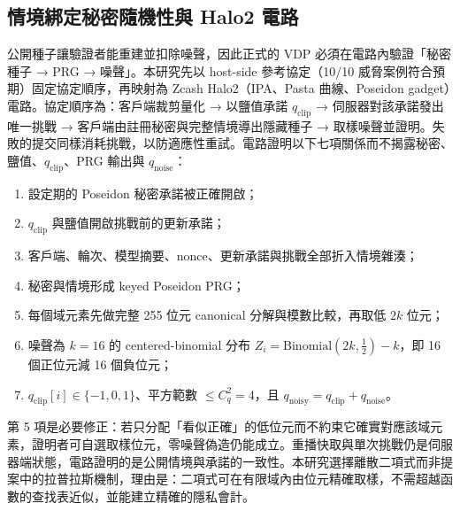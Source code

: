 \documentclass[12pt,a4paper]{article}
\newcommand{\qclip}{q_{\mathrm{clip}}}
\newcommand{\qnoise}{q_{\mathrm{noise}}}
\newcommand{\qnoisy}{q_{\mathrm{noisy}}}
\begin{document}
\subsection{情境綁定秘密隨機性與 Halo2 電路}
\label{sec:halo2}
公開種子讓驗證者能重建並扣除噪聲，因此正式的 VDP 必須在電路內驗證「秘密種子 → PRG → 噪聲」。本研究先以 host-side 參考協定（10/10 威脅案例符合預期）固定協定順序，再映射為 Zcash Halo2（IPA、Pasta 曲線、Poseidon gadget）電路。協定順序為：客戶端裁剪量化 → 以鹽值承諾 $\qclip$ → 伺服器對該承諾發出唯一挑戰 → 客戶端由註冊秘密與完整情境導出隱藏種子 → 取樣噪聲並證明。失敗的提交同樣消耗挑戰，以防適應性重試。電路證明以下七項關係而不揭露秘密、鹽值、$\qclip$、PRG 輸出與 $\qnoise$：
\begin{enumerate}
  \item 設定期的 Poseidon 秘密承諾被正確開啟；
  \item $\qclip$ 與鹽值開啟挑戰前的更新承諾；
  \item 客戶端、輪次、模型摘要、nonce、更新承諾與挑戰全部折入情境雜湊；
  \item 秘密與情境形成 keyed Poseidon PRG；
  \item 每個域元素先做完整 255 位元 canonical 分解與模數比較，再取低 $2k$ 位元；
  \item 噪聲為 $k=16$ 的 centered-binomial 分布 $Z_i=\mathrm{Binomial}(2k,\tfrac12)-k$，即 16 個正位元減 16 個負位元；
  \item $\qclip[i]\in\{-1,0,1\}$、平方範數 $\le C_q^2=4$，且 $\qnoisy=\qclip+\qnoise$。
\end{enumerate}
第 5 項是必要修正：若只分配「看似正確」的低位元而不約束它確實對應該域元素，證明者可自選取樣位元，零噪聲偽造仍能成立。重播快取與單次挑戰仍是伺服器端狀態，電路證明的是公開情境與承諾的一致性。本研究選擇離散二項式而非提案中的拉普拉斯機制，理由是：二項式可在有限域內由位元精確取樣，不需超越函數的查找表近似，並能建立精確的隱私會計。
\end{document}
